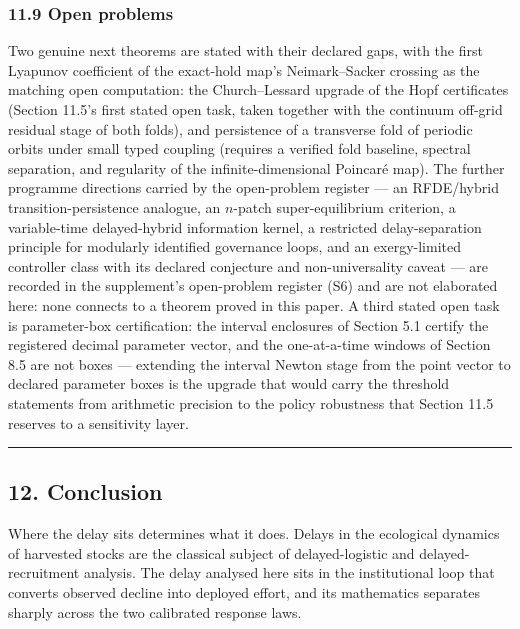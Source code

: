 \documentclass[11pt]{article}
\begin{document}
\subsubsection{11.9 Open problems}\label{open-problems}

Two genuine next theorems are stated with their declared gaps, with the
first Lyapunov coefficient of the exact-hold map's Neimark--Sacker
crossing as the matching open computation: the Church--Lessard upgrade
of the Hopf certificates (Section 11.5's first stated open task, taken
together with the continuum off-grid residual stage of both folds), and
persistence of a transverse fold of periodic orbits under small typed
coupling (requires a verified fold baseline, spectral separation, and
regularity of the infinite-dimensional Poincar\'e map). The further
programme directions carried by the open-problem register --- an
RFDE/hybrid transition-persistence analogue, an \(n\)-patch
super-equilibrium criterion, a variable-time delayed-hybrid information
kernel, a restricted delay-separation principle for modularly identified
governance loops, and an exergy-limited controller class with its
declared conjecture and non-universality caveat --- are recorded in the
supplement's open-problem register (S6) and are not elaborated here:
none connects to a theorem proved in this paper. A third stated open
task is parameter-box certification: the interval enclosures of Section
5.1 certify the registered decimal parameter vector, and the
one-at-a-time windows of Section 8.5 are not boxes --- extending the
interval Newton stage from the point vector to declared parameter boxes
is the upgrade that would carry the threshold statements from arithmetic
precision to the policy robustness that Section 11.5 reserves to a
sensitivity layer.

\begin{center}\rule{0.5\linewidth}{0.5pt}\end{center}

\subsection{12. Conclusion}\label{conclusion}

Where the delay sits determines what it does. Delays in the ecological
dynamics of harvested stocks are the classical subject of
delayed-logistic and delayed-recruitment analysis. The delay analysed
here sits in the institutional loop that converts observed decline into
deployed effort, and its mathematics separates sharply across the two
calibrated response laws.
\end{document}
